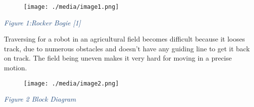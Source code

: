 \documentclass[12pt]{article}
\begin{document}
\begin{figure}[H]
	\begin{Center}
		\texttt{[image: ./media/image1.png]}
	\end{Center}
\end{figure}



\par

\setlength{\parskip}{9.96pt}
\begin{adjustwidth}{0.5in}{0.52in}
\begin{Center}
{\fontsize{9pt}{10.8pt}\selectfont \textit{\textcolor[HTML]{1F497D}{Figure 1:Rocker Bogie [1]}}\par}
\end{Center}\par

\end{adjustwidth}

\begin{adjustwidth}{0.5in}{0.52in}
\begin{justify}
Traversing for a robot in an agricultural field becomes difficult because it looses track, due to numerous obstacles and doesn’t have any guiding line to get it back on track. The field being uneven makes it very hard for moving in a precise motion. 
\end{justify}\par

\end{adjustwidth}




\begin{figure}[H]
	\begin{Center}
		\texttt{[image: ./media/image2.png]}
	\end{Center}
\end{figure}



\par

\begin{adjustwidth}{0.5in}{0.52in}
\begin{Center}
{\fontsize{9pt}{10.8pt}\selectfont \textit{\textcolor[HTML]{1F497D}{Figure 2 Block Diagram}}\par}
\end{Center}\par

\end{adjustwidth}
\end{document}

